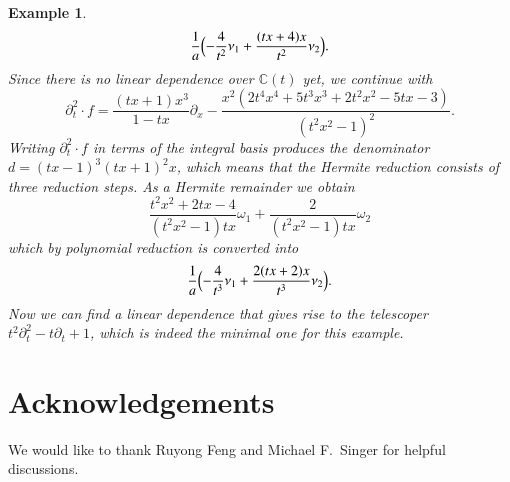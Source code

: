 \documentclass[final,1p,times,authoryear]{elsarticle}
\newtheorem{example}[theorem]{Example}
\newcommand{\bC}{ {\mathbb C}}
\begin{document}
\begin{example}
\[  \frac1a \Bigl( -\frac{4}{t^2} \nu_1 + \frac{(tx+4)x}{t^2} \nu_2 \Bigr).
\]
Since there is no linear dependence over $\bC(t)$ yet, we continue with
\[
  \partial_t^2\cdot f =
  \frac{(tx+1)x^3}{1-tx} \partial_x -
  \frac{x^2(2t^4x^4+5t^3x^3+2t^2x^2-5tx-3)}{(t^2x^2-1)^2}.
\]
Writing $\partial_t^2\cdot f$ in terms of the integral basis produces the denominator
$d=(tx-1)^3(tx+1)^2x$, which means that the Hermite reduction consists of three
reduction steps. As a Hermite remainder we obtain
\[
  \frac{t^2x^2+2tx-4}{(t^2x^2-1)tx} \omega_1 + \frac{2}{(t^2x^2-1)tx} \omega_2
\]
which by polynomial reduction is converted into
\[
  \frac1a \Bigl( -\frac{4}{t^3} \nu_1 + \frac{2(tx+2)x}{t^3} \nu_2 \Bigr).
\]
Now we can find a linear dependence that gives rise to the telescoper
$t^2\partial_t^2-t\partial_t+1$, which is indeed the minimal one for this example.
\end{example}

\section*{Acknowledgements}

We would like to thank Ruyong Feng and Michael F.\ Singer for helpful discussions.



\end{document}
